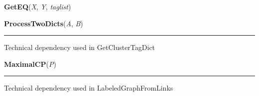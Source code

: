     \vspace{0.5ex}

\hspace{.8\funcindent}\begin{boxedminipage}{\funcwidth}

    \raggedright \textbf{GetEQ}(\textit{X}, \textit{Y}, \textit{taglist})

\setlength{\parskip}{2ex}
\setlength{\parskip}{1ex}
    \end{boxedminipage}

    \label{System:SystemGraphOperations:ProcessTwoDicts}

    \vspace{0.5ex}

\hspace{.8\funcindent}\begin{boxedminipage}{\funcwidth}

    \raggedright \textbf{ProcessTwoDicts}(\textit{A}, \textit{B})

    \vspace{-1.5ex}

    \rule{\textwidth}{0.5\fboxrule}
\setlength{\parskip}{2ex}
    Technical dependency used in GetClusterTagDict

\setlength{\parskip}{1ex}
    \end{boxedminipage}

    \label{System:SystemGraphOperations:MaximalCP}

    \vspace{0.5ex}

\hspace{.8\funcindent}\begin{boxedminipage}{\funcwidth}

    \raggedright \textbf{MaximalCP}(\textit{P})

    \vspace{-1.5ex}

    \rule{\textwidth}{0.5\fboxrule}
\setlength{\parskip}{2ex}
    Technical dependency used in LabeledGraphFromLinks

\setlength{\parskip}{1ex}
    \end{boxedminipage}

    \label{System:SystemGraphOperations:SPathAlong}

